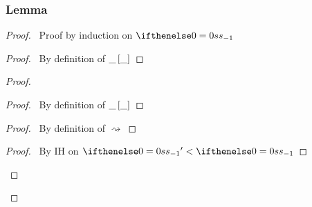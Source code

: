 \documentclass[a4paper]{article}
\begin{document}
\subsubsection{Lemma} \label{lemma-simpl-stable-context}
\begin{proof}
  \pfsketch\ Proof by induction on $\aStack$
  \begin{proof}
    \pf\ By definition of $\_ \left[ \_ \right]$
  \end{proof}
  \begin{proof}
    \begin{proof}
      \pf\ By definition of $\_ \left[ \_ \right]$  
    \end{proof}
    \begin{proof}
      \pf\ By definition of $\rightsquigarrow$ 
    \end{proof}
    \qedstep
    \begin{proof}
      \pf\ By IH on $\aStack' < \aStack$
    \end{proof}
  \end{proof}
\end{proof}
\end{document}
